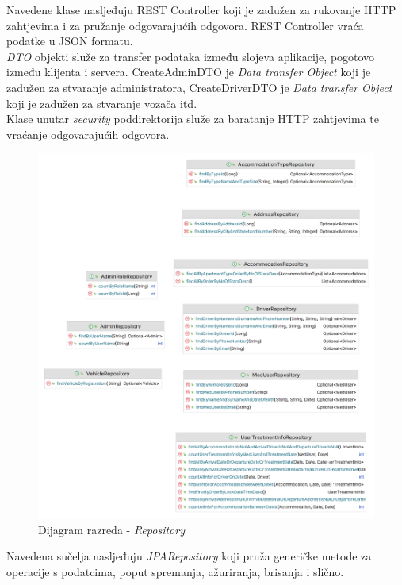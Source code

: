 			{Navedene klase nasljeđuju REST Controller koji je zadužen za rukovanje HTTP zahtjevima i za pružanje odgovarajućih odgovora. REST Controller vraća podatke u JSON formatu. \\
			\textit{DTO} objekti služe za transfer podataka između slojeva aplikacije, pogotovo između klijenta i servera.	 
			CreateAdminDTO je \textit{Data transfer Object} koji je zadužen za stvaranje administratora, CreateDriverDTO je \textit{Data transfer Object} koji je zadužen za stvaranje vozača itd.  \\
			Klase unutar \textit{security} poddirektorija služe za baratanje HTTP zahtjevima te vraćanje odgovarajućih odgovora.
			}
			
			\begin{figure}[H]
				\includegraphics[width=\textwidth]{slike/dao.PNG}
				\caption{Dijagram razreda - \textit{Repository}}
				\label{repositoryDiagram}
			\end{figure}
			
			{Navedena sučelja nasljeđuju \textit{JPARepository} koji pruža generičke metode za operacije s podatcima, poput spremanja, ažuriranja, brisanja i slično.}\\
			
